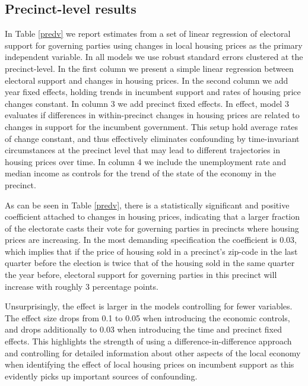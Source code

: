 \documentclass[12pt,a4paper]{article}
\begin{document}
	\subsection{Precinct-level results}
	In Table \ref{predv} we report estimates from a set of linear regression of electoral support for governing parties using changes in local housing prices as the primary independent variable. In all models we use robust standard errors clustered at the precinct-level. In the first column we present a simple linear regression between electoral support and changes in housing prices. In the second column we add year fixed effects, holding trends in incumbent support and rates of housing price changes constant. In column 3 we add precinct fixed effects. In effect, model 3 evaluates if differences in within-precinct changes in housing prices are related to changes in support for the incumbent government. This setup hold average rates of change constant, and thus effectively eliminates confounding by time-invariant circumstances at the precinct level that may lead to different trajectories in housing prices over time. In column 4 we include the unemployment rate and median income as controls for the trend of the state of the economy in the precinct.
	
	
	
	
	As can be seen in Table \ref{predv}, there is a statistically significant and positive coefficient attached to changes in housing prices, indicating that a larger fraction of the electorate casts their vote for governing parties in precincts where housing prices are increasing. In the most demanding specification the coefficient is 0.03,  which implies that if the price of housing sold in a precinct's zip-code in the last quarter before the election is twice that of the housing sold in the same quarter the year before, electoral support for  governing parties in this precinct will increase with roughly 3 percentage points.
	
	Unsurprisingly, the effect is larger in the models controlling for fewer variables. The effect size drops from 0.1 to 0.05 when introducing the economic controls, and drops additionally to 0.03 when introducing the time and precinct fixed effects. This highlights the strength of using a difference-in-difference approach and controlling for detailed information about other aspects of the local economy when identifying the effect of local housing prices on incumbent support as this evidently picks up important sources of confounding.
\end{document}
